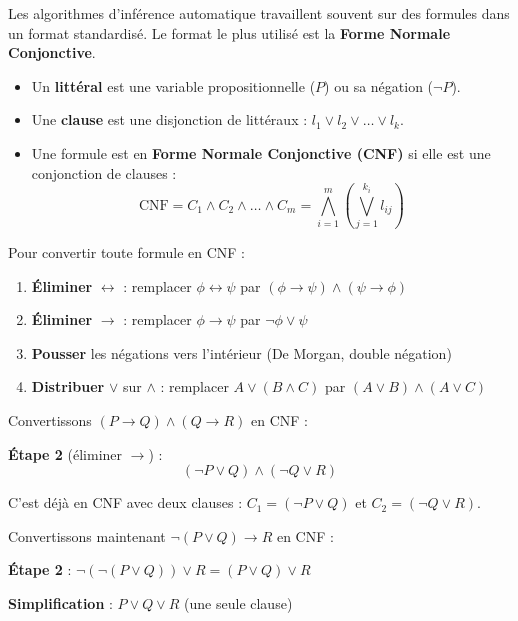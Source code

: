 \documentclass[11pt,a4paper]{article}
\begin{document}
Les algorithmes d'inférence automatique travaillent souvent sur des formules dans un format standardisé. Le format le plus utilisé est la \textbf{Forme Normale Conjonctive}.

\begin{definitionbox}
\begin{itemize}[nosep]
    \item Un \textbf{littéral} est une variable propositionnelle ($P$) ou sa négation ($\neg P$).
    \item Une \textbf{clause} est une disjonction de littéraux : $l_1 \lor l_2 \lor \ldots \lor l_k$.
    \item Une formule est en \textbf{Forme Normale Conjonctive (CNF)} si elle est une conjonction de clauses :
    $$\text{CNF} = C_1 \land C_2 \land \ldots \land C_m = \bigwedge_{i=1}^{m} \left(\bigvee_{j=1}^{k_i} l_{ij}\right)$$
\end{itemize}
\end{definitionbox}

\begin{recipebox}
Pour convertir toute formule en CNF :
\begin{enumerate}
    \item \textbf{Éliminer} $\leftrightarrow$ : remplacer $\phi \leftrightarrow \psi$ par $(\phi \rightarrow \psi) \land (\psi \rightarrow \phi)$
    \item \textbf{Éliminer} $\rightarrow$ : remplacer $\phi \rightarrow \psi$ par $\neg \phi \lor \psi$
    \item \textbf{Pousser} les négations vers l'intérieur (De Morgan, double négation)
    \item \textbf{Distribuer} $\lor$ sur $\land$ : remplacer $A \lor (B \land C)$ par $(A \lor B) \land (A \lor C)$
\end{enumerate}
\end{recipebox}

\begin{exemplebox}
Convertissons $(P \rightarrow Q) \land (Q \rightarrow R)$ en CNF :

\textbf{Étape 2} (éliminer $\rightarrow$) :
$$(\neg P \lor Q) \land (\neg Q \lor R)$$

C'est déjà en CNF avec deux clauses : $C_1 = (\neg P \lor Q)$ et $C_2 = (\neg Q \lor R)$.

\medskip

Convertissons maintenant $\neg(P \lor Q) \rightarrow R$ en CNF :

\textbf{Étape 2} : $\neg(\neg(P \lor Q)) \lor R = (P \lor Q) \lor R$

\textbf{Simplification} : $P \lor Q \lor R$ \quad (une seule clause)
\end{exemplebox}
\end{document}
